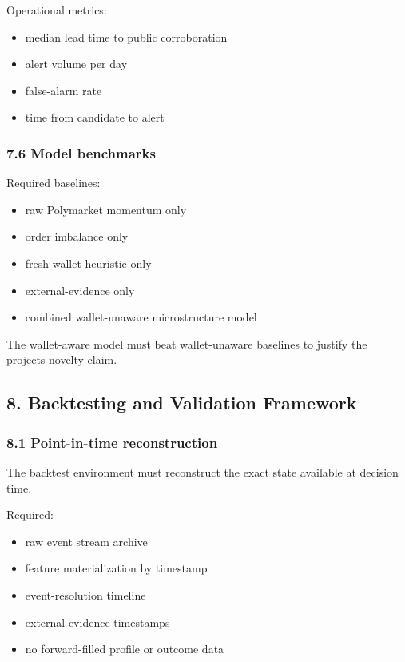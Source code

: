 \documentclass[
]{article}
\providecommand{\tightlist}{%
  \setlength{\itemsep}{0pt}\setlength{\parskip}{0pt}}
\begin{document}
Operational metrics:

\begin{itemize}
\tightlist
\item
  median lead time to public corroboration
\item
  alert volume per day
\item
  false-alarm rate
\item
  time from candidate to alert
\end{itemize}

\subsubsection{7.6 Model benchmarks}\label{76-model-benchmarks}

Required baselines:

\begin{itemize}
\tightlist
\item
  raw Polymarket momentum only
\item
  order imbalance only
\item
  fresh-wallet heuristic only
\item
  external-evidence only
\item
  combined wallet-unaware microstructure model
\end{itemize}

The wallet-aware model must beat wallet-unaware baselines to justify the
project\textquotesingle s novelty claim.

\subsection{8. Backtesting and Validation
Framework}\label{8-backtesting-and-validation-framework}

\subsubsection{8.1 Point-in-time
reconstruction}\label{81-point-in-time-reconstruction}

The backtest environment must reconstruct the exact state available at
decision time.

Required:

\begin{itemize}
\tightlist
\item
  raw event stream archive
\item
  feature materialization by timestamp
\item
  event-resolution timeline
\item
  external evidence timestamps
\item
  no forward-filled profile or outcome data
\end{itemize}
\end{document}
